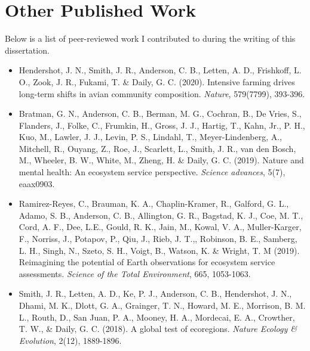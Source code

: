 \chapter{Other Published Work}

Below is a list of peer-reviewed work I contributed to during the writing of this dissertation.

\begin{itemize}

\item Hendershot, J. N., Smith, J. R., Anderson, C. B., Letten, A. D., Frishkoff, L. O., Zook, J. R., Fukami, T. \& Daily, G. C. (2020). Intensive farming drives long-term shifts in avian community composition. \textit{Nature}, 579(7799), 393-396.

\item Bratman, G. N., Anderson, C. B., Berman, M. G., Cochran, B., De Vries, S., Flanders, J., Folke, C., Frumkin, H., Gross, J. J., Hartig, T., Kahn, Jr., P. H., Kuo, M., Lawler, J. J., Levin, P. S., Lindahl, T., Meyer-Lindenberg, A., Mitchell, R., Ouyang, Z., Roe, J., Scarlett, L., Smith, J. R., van den Bosch, M., Wheeler, B. W., White, M., Zheng, H. \&  Daily, G. C. (2019). Nature and mental health: An ecosystem service perspective. \textit{Science advances}, 5(7), eaax0903.

\item Ramirez-Reyes, C., Brauman, K. A., Chaplin-Kramer, R., Galford, G. L., Adamo, S. B., Anderson, C. B., Allington, G. R., Bagstad, K. J., Coe, M. T., Cord, A. F., Dee, L.E., Gould, R. K., Jain, M., Kowal, V. A., Muller-Karger, F., Norriss, J., Potapov, P., Qiu, J., Rieb, J. T.,, Robinson, B. E., Samberg, L. H., Singh, N., Szeto, S. H., Voigt, B., Watson, K. \& Wright, T. M (2019). Reimagining the potential of Earth observations for ecosystem service assessments. \textit{Science of the Total Environment}, 665, 1053-1063.

\item Smith, J. R., Letten, A. D., Ke, P. J., Anderson, C. B., Hendershot, J. N., Dhami, M. K., Dlott, G. A., Grainger, T. N., Howard, M. E., Morrison, B. M. L., Routh, D., San Juan, P. A., Mooney, H. A., Mordecai, E. A., Crowther, T. W., \& Daily, G. C. (2018). A global test of ecoregions. \textit{Nature Ecology \& Evolution}, 2(12), 1889-1896.

\end{itemize}
